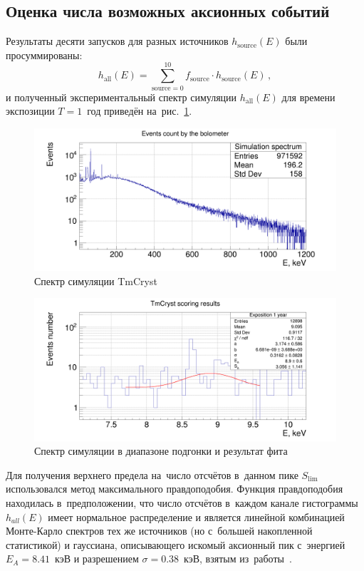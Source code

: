 \documentclass[a4paper,article,14pt]{extarticle}
\begin{document}
\subsection{Оценка числа возможных аксионных событий}
Результаты десяти запусков для разных источников $h_{\mathrm{source}} (E)$ были просуммированы:
\begin{equation}
    h_\mathrm{all}(E) = 
        \sum\limits_{\mathrm{source} = 0}^{10}
        f_\mathrm{source} \cdot h_\mathrm{source}(E)\, ,
\end{equation}
и полученный экспериментальный спектр симуляции $h_\mathrm{all}(E)$ для времени экспозиции $T=1$~год приведён на~рис.~\ref{hist_all}.
\begin{figure}[t]
    \centering
    \includegraphics[width = \textwidth]{images/SpectrumTmCryst.png}
    \caption{Спектр симуляции TmCryst}\label{hist_all}
\end{figure}
\begin{figure}[t]
    \centering
    \includegraphics[width = \textwidth]{images/AxionFit.png}
    \caption{Спектр симуляции в диапазоне подгонки и результат фита}\label{AxionFit}
\end{figure}
Для получения верхнего предела на~число отсчётов в~данном пике $S_\mathrm{lim}$ использовался метод максимального правдоподобия.
Функция правдоподобия находилась в~предположении, что число отсчётов в~каждом канале гистограммы $h_{all} (E)$ имеет нормальное распределение и является линейной комбинацией Монте-Карло спектров тех же источников (но с~большей накопленной статистикой) и гауссиана, описывающего искомый аксионный пик с~энергией $E_A = 8.41$~кэВ и разрешением $\sigma = 0.38$~кэВ, взятым из~работы~\cite{test_bolometric_tm}.
\end{document}
